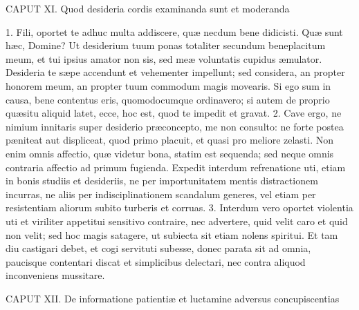 \documentclass[twoside]{article}
\begin{document}
CAPUT XI.
Quod desideria cordis examinanda sunt et moderanda

1. Fili, oportet te adhuc multa addiscere, quæ necdum bene didicisti.
Quæ sunt hæc, Domine?
Ut desiderium tuum ponas totaliter secundum beneplacitum meum, et tui ipsius amator non sis, sed meæ voluntatis cupidus æmulator. Desideria te sæpe accendunt et vehementer impellunt; sed considera, an propter honorem meum, an propter tuum commodum magis movearis. Si ego sum in causa, bene contentus eris, quomodocumque ordinavero; si autem de proprio quæsitu aliquid latet, ecce, hoc est, quod te impedit et gravat.
2. Cave ergo, ne nimium innitaris super desiderio præconcepto, me non consulto: ne forte postea pæniteat aut displiceat, quod primo placuit, et quasi pro meliore zelasti. Non enim omnis affectio, quæ videtur bona, statim est sequenda; sed neque omnis contraria affectio ad primum fugienda. Expedit interdum refrenatione uti, etiam in bonis studiis et desideriis, ne per importunitatem mentis distractionem incurras, ne aliis per indisciplinationem scandalum generes, vel etiam per resistentiam aliorum subito turberis et corruas.
3. Interdum vero oportet violentia uti et viriliter appetitui sensitivo contraire, nec advertere, quid velit caro et quid non velit; sed hoc magis satagere, ut subiecta sit etiam nolens spiritui. Et tam diu castigari debet, et cogi servituti subesse, donec parata sit ad omnia, paucisque contentari discat et simplicibus delectari, nec contra aliquod inconveniens mussitare.


CAPUT XII.
De informatione patientiæ et luctamine adversus concupiscentias
\end{document}
